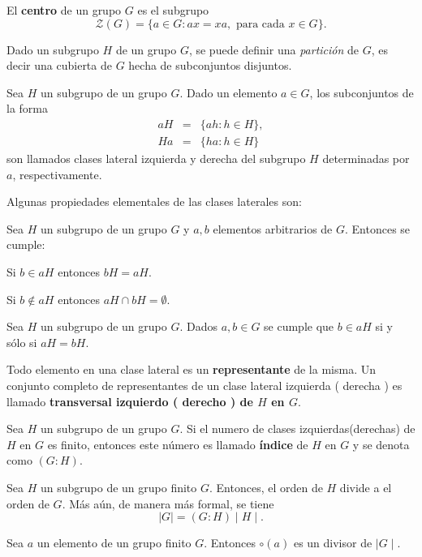  \begin{definicion}
 El \textbf{centro} de un grupo $G$ es el subgrupo \[ \mathcal{Z}(G) = \{ a \in G \colon ax=xa, \mbox{ para cada }  x \in G \}. \]
\end{definicion}
Dado un subgrupo $H$ de un grupo $G$, se puede definir una \textit{partición} de $G$, es decir una cubierta de $G$ hecha de subconjuntos disjuntos. 
\begin{definicion}
Sea $H$ un subgrupo de un grupo $G$. Dado un elemento $a \in G$, los subconjuntos de la forma 
\begin{eqnarray*}
aH &=& \{ ah \colon h \in H \}, \\
Ha &=& \{ ha \colon h \in H \} 
\end{eqnarray*}
son llamados  clases lateral izquierda y derecha del subgrupo $H$ determinadas por $a$, respectivamente.
\end{definicion}
Algunas propiedades elementales de las clases laterales son:
\begin{proposicion}
Sea $H$ un subgrupo de un grupo $G$ y $a,b$ elementos arbitrarios de $G$. Entonces se cumple:
\begin{bulletList}
\item Si $b \in aH$ entonces $bH = aH$.
\item Si $b \notin aH$ entonces $aH \cap bH = \emptyset$.
\end{bulletList}
\end{proposicion}
\begin{corolario}
Sea $H$ un subgrupo de un grupo $G$. Dados $a,b \in G$ se cumple que $b \in aH$ si y sólo si $aH = bH$.
\end{corolario}
Todo elemento en una clase lateral es un \textbf{representante} de la misma. Un conjunto completo de representantes de un clase lateral izquierda ( derecha ) es llamado \textbf{transversal izquierdo ( derecho ) de $H$ en $G$}.
\begin{definicion}
Sea $H$ un subgrupo de un grupo $G$. Si el numero de clases izquierdas(derechas) de $H$ en $G$ es finito, entonces este número es llamado  \textbf{índice} de $H$ en $G$ y se denota como $(G:H)$.
\end{definicion}
\begin{teorema}[Lagrange]
Sea $H$ un subgrupo de un grupo finito $G$. Entonces, el orden de $H$ divide a el orden de $G$. Más aún, de manera más formal, se tiene
\[ \mid G \mid = (G:H) \mid H \mid. \]
\end{teorema}
\begin{corolario}
Sea $a$ un elemento de un grupo finito $G$. Entonces $\circ(a)$ es un divisor de $\mid G \mid$.
\end{corolario}
